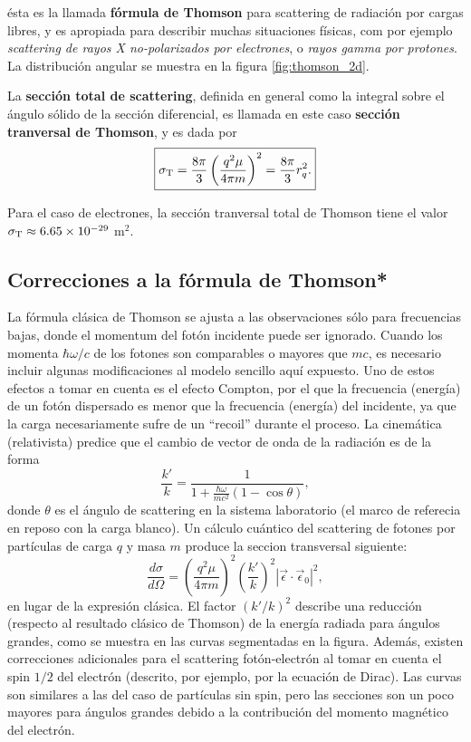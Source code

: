 ésta es la llamada \textbf{fórmula de Thomson} para scattering de radiación
por cargas libres, y es apropiada para describir muchas situaciones físicas, com por ejemplo \textit{scattering de rayos X no-polarizados por electrones}, o \textit{rayos gamma por protones}. 
La distribución angular se muestra en la figura \ref{fig:thomson_2d}. 

La \textbf{sección total de scattering}, definida en general como la integral sobre el ángulo sólido de la sección diferencial, es llamada en este caso \textbf{sección tranversal de Thomson}, y es dada por
\begin{equation}
\boxed{\sigma_{\rm T}=\frac{8\pi}{3}\left(\frac{q^2\mu}{4\pi m}\right)^2=\frac{8\pi}{3} r_q^2.}
\end{equation}

Para el caso de electrones, la sección tranversal total de Thomson tiene el valor $\sigma_{\rm T}\approx 6.65\times 10^{-29}$ m$^2$.

\subsection{Correcciones a la fórmula de Thomson*}
La fórmula clásica de Thomson se ajusta a las observaciones sólo para frecuencias bajas, donde el momentum del fotón incidente puede ser ignorado. Cuando los momenta $\hbar\omega/c$ de los fotones son comparables o mayores que $mc$, es necesario incluir algunas modificaciones al modelo sencillo aquí expuesto. Uno de estos efectos a tomar en cuenta es el efecto Compton, por el que la frecuencia (energía) de un fotón dispersado es menor que la frecuencia (energía) del incidente, ya que la carga necesariamente sufre de un ``recoil'' durante el proceso. La cinemática (relativista) predice que el cambio de vector de onda de la radiación es de la forma
\begin{equation}
\frac{k'}{k}=\frac{1}{1+\frac{\hbar\omega}{mc^2}\left(  1-\cos
\theta\right)  }, \label{Thomson}
\end{equation}
donde $\theta$ es el ángulo de scattering en la sistema laboratorio (el marco
de referecia en reposo con la carga blanco). Un cálculo cuántico del
scattering de fotones por partículas de carga $q$ y masa $m$ produce la seccion
transversal siguiente:
\begin{equation}
\frac{d\sigma}{d\Omega}=\left(\frac{q^2\mu}{4\pi m}\right)^2  \left(
\frac{k'}{k}\right)^2\left|  \vec{\epsilon}\cdot\vec{\epsilon}_0\right|
^2 , \label{Thomson-corr}
\end{equation}
en lugar de la expresión clásica. El factor $(k'/k)^2$ describe una
reducción  (respecto al resultado clásico de Thomson) de la energía radiada
para ángulos grandes, como se muestra en las curvas segmentadas en la figura.
Además, existen correcciones adicionales para el scattering fotón-electrón al
tomar en cuenta el spin ${1}/{2}$ del electrón (descrito, por ejemplo, por
la ecuación de Dirac). Las curvas son similares a las del caso de partículas
sin spin, pero las secciones son un poco mayores para ángulos grandes debido a
la contribución del momento magnético del electrón.

